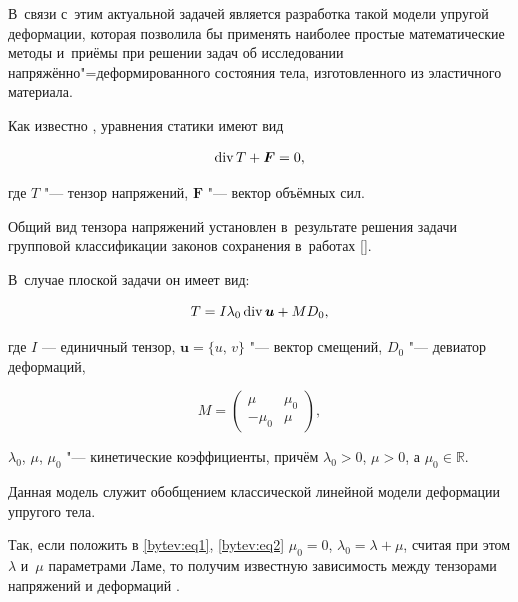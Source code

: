 В~связи с~этим актуальной задачей является разработка такой модели упругой деформации, которая позволила бы применять наиболее простые математические методы и~приёмы при решении задач об исследовании напряжённо"=деформированного состояния тела, изготовленного из эластичного материала.



\smallskip




Как известно \cite{Mushelishvili}, уравнения статики имеют вид

$${\rm div\,}{T}+\boldsymbol{F}=0,$$

где $T$ "--- тензор напряжений, $\boldsymbol{F}$ "--- вектор объёмных сил.

Общий вид тензора напряжений установлен в~результате решения задачи групповой классификации законов сохранения в~работах []. 

В~случае плоской задачи он имеет вид:

\begin{equation}

\label{bytev:eq1}

T=I \lambda_{0} {\rm \, div\,} \boldsymbol{u}+MD_{0},

\end{equation}

где $I$ --- единичный тензор, $\boldsymbol{u}=\{u,\,v\}$ "--- вектор смещений, $D_{0}$ "--- девиатор деформаций,

\begin{equation}

\label{bytev:eq2}

M=

\left(\begin{array}{cc}

\mu & \mu_{0}\\

-\mu_{0} & \mu \end{array}\right),

\end{equation}

$\lambda_{0}$, $\mu$, $\mu_{0}$ "--- кинетические коэффициенты, причём $\lambda_{0}>0$, $\mu>0$, а $\mu_{0}\in\mathbb{R}$.



Данная модель служит обобщением классической линейной модели деформации упругого тела. 

Так, если положить в \eqref{bytev:eq1}, \eqref{bytev:eq2} $\mu_{0}=0$, $\lambda_{0}=\lambda+\mu$, считая при этом $\lambda$ и~$\mu$ параметрами Ламе, то получим известную зависимость между тензорами напряжений и деформаций \cite{Mushelishvili}.



